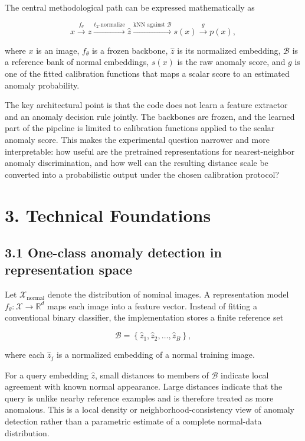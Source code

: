 \documentclass[
  11pt,
]{article}
\begin{document}
The central methodological path can be expressed mathematically as

\[
x \xrightarrow{f_\theta} z \xrightarrow{\ell_2\text{-normalize}} \hat z
\xrightarrow{\text{kNN against }\mathcal{B}} s(x)
\xrightarrow{g} p(x),
\]

where \(x\) is an image, \(f_\theta\) is a frozen backbone, \(\hat z\)
is its normalized embedding, \(\mathcal{B}\) is a reference bank of
normal embeddings, \(s(x)\) is the raw anomaly score, and \(g\) is one
of the fitted calibration functions that maps a scalar score to an
estimated anomaly probability.

The key architectural point is that the code does not learn a feature
extractor and an anomaly decision rule jointly. The backbones
are frozen, and the learned part of the pipeline is limited to
calibration functions applied to the scalar anomaly score. This makes
the experimental question narrower and more interpretable: how useful
are the pretrained representations for nearest-neighbor anomaly
discrimination, and how well can the resulting distance scale be
converted into a probabilistic output under the chosen calibration
protocol?

\section{3. Technical Foundations}\label{technical-foundations}

\subsection{3.1 One-class anomaly detection in representation
space}\label{one-class-anomaly-detection-in-representation-space}

Let \(\mathcal{X}_{\mathrm{normal}}\) denote the distribution of nominal
images. A representation model
\(f_\theta:\mathcal{X}\rightarrow\mathbb{R}^{d}\) maps each image into a
feature vector. Instead of fitting a conventional binary classifier, the
implementation stores a finite reference set

\[
\mathcal{B}=\left\{\hat z_1,\hat z_2,\ldots,\hat z_B\right\},
\]

where each \(\hat z_j\) is a normalized embedding of a normal training
image.

For a query embedding \(\hat z\), small distances to members of
\(\mathcal{B}\) indicate local agreement with known normal appearance.
Large distances indicate that the query is unlike nearby reference
examples and is therefore treated as more anomalous. This is a local
density or neighborhood-consistency view of anomaly detection rather
than a parametric estimate of a complete normal-data distribution.
\end{document}
